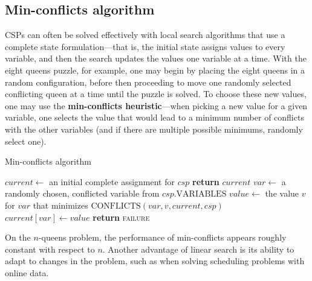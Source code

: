 
\subsection{Min-conflicts algorithm}
\label{sub:min_conflicts_algorithm}

CSPs can often be solved effectively with local search algorithms that use a complete state formulation---that is, the initial state assigns values to every variable, and then the search updates the values one variable at a time. With the eight queens puzzle, for example, one may begin by placing the eight queens in a random configuration, before then proceeding to move one randomly selected conflicting queen at a time until the puzzle is solved. To choose these new values, one may use the \textbf{min-conflicts heuristic}---when picking a new value for a given variable, one selects the value that would lead to a minimum number of conflicts with the other variables (and if there are multiple possible minimums, randomly select one).

\begin{algorithm}[H]
\caption{Min-conflicts algorithm}
\begin{algorithmic}[1]
\State $current \gets$ an initial complete assignment for $csp$
\State \textbf{return} $current$
\EndIf
    \State $var \gets$ a randomly chosen, conflicted variable from $csp.\text{VARIABLES}$
    \State $value \gets$ the value $v$ for $var$ that minimizes $\text{CONFLICTS}(var, v, current, csp)$
    \State $current[var] \gets value$
\EndFor
\State \textbf{return} \textsc{failure}
\EndProcedure
\end{algorithmic}
\end{algorithm}

On the $n$-queens problem, the performance of min-conflicts appears roughly constant with respect to $n$. Another advantage of linear search is its ability to adapt to changes in the problem, such as when solving scheduling problems with online data.



